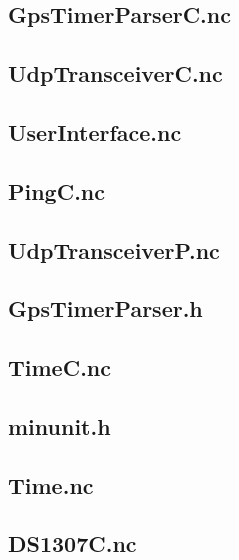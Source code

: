 \documentclass[12pt,a4paper,titlepage,oneside]{article}
\begin{document}
{\subsection{GpsTimerParserC.nc}


\subsection{UdpTransceiverC.nc}


\subsection{UserInterface.nc}


\subsection{PingC.nc}


\subsection{UdpTransceiverP.nc}


\subsection{GpsTimerParser.h}


\subsection{TimeC.nc}


\subsection{minunit.h}


\subsection{Time.nc}


\subsection{DS1307C.nc}


}
\end{document}
